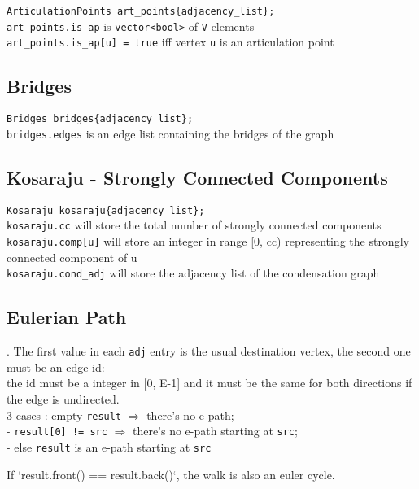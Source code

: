 \verb|ArticulationPoints art_points{adjacency_list};| \\
\verb|art_points.is_ap| is \verb|vector<bool>| of \verb|V| elements \\
\verb|art_points.is_ap[u] = true| iff vertex \verb|u| is an articulation point


\subsection{Bridges}

\verb|Bridges bridges{adjacency_list};| \\
\verb|bridges.edges| is an edge list containing the bridges of the graph


\subsection{Kosaraju - Strongly Connected Components}

\verb|Kosaraju kosaraju{adjacency_list};| \\
\verb|kosaraju.cc| will store the total number of strongly connected components \\
\verb|kosaraju.comp[u]| will store an integer in range [0, cc) representing the strongly connected component of u \\
\verb|kosaraju.cond_adj| will store the adjacency list of the condensation graph

\subsection{Eulerian Path}
. 
The first value in each \verb|adj| entry is the usual destination vertex, the second one must be an edge id: \\
the id must be a integer in [0, E-1] and it must be the same for both directions if the edge is undirected.\\
3 cases : empty \verb|result| $\Rightarrow$ there's no e-path; \\
- \verb|result[0] != src| $\Rightarrow$ there's no e-path starting at \verb|src|; \\
- else \verb|result| is an e-path starting at \verb|src|

If `result.front() == result.back()`, the walk is also an euler cycle.

